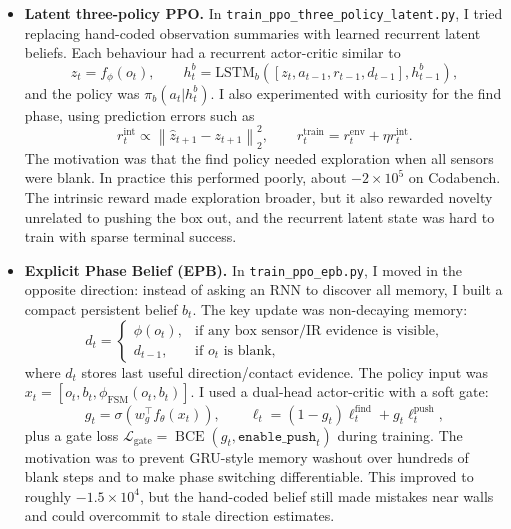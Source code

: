 \documentclass[11pt, oneside]{article}
\begin{document}
\begin{itemize}
    \item \textbf{Latent three-policy PPO.} In \texttt{train\_ppo\_three\_policy\_latent.py}, I tried replacing hand-coded observation summaries with learned recurrent latent beliefs. Each behaviour had a recurrent actor-critic similar to
    \[
    z_t=f_\phi(o_t),\qquad h_t^b=\mathrm{LSTM}_b([z_t,a_{t-1},r_{t-1},d_{t-1}],h_{t-1}^b),
    \]
    and the policy was \(\pi_b(a_t|h_t^b)\). I also experimented with curiosity for the find phase, using prediction errors such as
    \[
    r_t^{\mathrm{int}}\propto \left\|\hat{z}_{t+1}-z_{t+1}\right\|_2^2,
    \qquad
    r_t^{\mathrm{train}}=r_t^{\mathrm{env}}+\eta r_t^{\mathrm{int}}.
    \]
    The motivation was that the find policy needed exploration when all sensors were blank. In practice this performed poorly, about \(-2\times10^5\) on Codabench. The intrinsic reward made exploration broader, but it also rewarded novelty unrelated to pushing the box out, and the recurrent latent state was hard to train with sparse terminal success.

    \item \textbf{Explicit Phase Belief (EPB).} In \texttt{train\_ppo\_epb.py}, I moved in the opposite direction: instead of asking an RNN to discover all memory, I built a compact persistent belief \(b_t\). The key update was non-decaying memory:
    \[
    d_t=
    \begin{cases}
    \phi(o_t), & \text{if any box sensor/IR evidence is visible},\\
    d_{t-1}, & \text{if }o_t\text{ is blank},
    \end{cases}
    \]
    where \(d_t\) stores last useful direction/contact evidence. The policy input was \(x_t=[o_t,b_t,\phi_{\mathrm{FSM}}(o_t,b_t)]\). I used a dual-head actor-critic with a soft gate:
    \[
    g_t=\sigma(w_g^\top f_\theta(x_t)),\qquad
    \ell_t=(1-g_t)\ell_t^{\mathrm{find}}+g_t\ell_t^{\mathrm{push}},
    \]
    plus a gate loss \(\mathcal{L}_{\mathrm{gate}}=\operatorname{BCE}(g_t,\texttt{enable\_push}_t)\) during training. The motivation was to prevent GRU-style memory washout over hundreds of blank steps and to make phase switching differentiable. This improved to roughly \(-1.5\times10^4\), but the hand-coded belief still made mistakes near walls and could overcommit to stale direction estimates.


\end{itemize}
\end{document}
